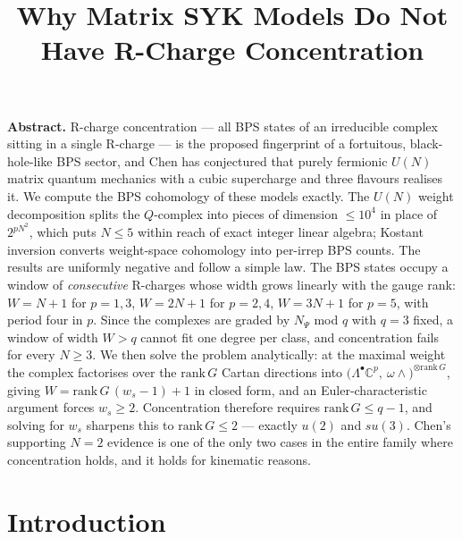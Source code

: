 \documentclass[10pt]{article}
\title{\vspace{-1.6cm}\Large\textbf{Why Matrix SYK Models Do Not Have R-Charge Concentration}\vspace{-4pt}}
\author{}
\date{}
\newcommand{\rank}{\mathrm{rank}\,}
\begin{document}
\maketitle
\vspace{-1.1cm}
\begin{center}\begin{minipage}{0.97\textwidth}\small
\textbf{Abstract.} R-charge concentration --- all BPS states of an irreducible complex sitting in a single R-charge --- is the proposed fingerprint of a fortuitous, black-hole-like BPS sector, and Chen has conjectured that purely fermionic $U(N)$ matrix quantum mechanics with a cubic supercharge and three flavours realises it. We compute the BPS cohomology of these models exactly. The $U(N)$ weight decomposition splits the $Q$-complex into pieces of dimension $\le 10^4$ in place of $2^{pN^2}$, which puts $N\le5$ within reach of exact integer linear algebra; Kostant inversion converts weight-space cohomology into per-irrep BPS counts. The results are uniformly negative and follow a simple law. The BPS states occupy a window of \emph{consecutive} R-charges whose width grows linearly with the gauge rank: $W=N+1$ for $p=1,3$, $W=2N+1$ for $p=2,4$, $W=3N+1$ for $p=5$, with period four in $p$. Since the complexes are graded by $N_\Psi$ mod $q$ with $q=3$ fixed, a window of width $W>q$ cannot fit one degree per class, and concentration fails for every $N\ge3$. We then solve the problem analytically: at the maximal weight the complex factorises over the $\rank G$ Cartan directions into $\big(\Lambda^\bullet\mathbb C^p,\ \omega\wedge\big)^{\otimes \rank G}$, giving $W=\rank G\,(w_s-1)+1$ in closed form, and an Euler-characteristic argument forces $w_s\ge2$. Concentration therefore requires $\rank G\le q-1$, and solving for $w_s$ sharpens this to $\rank G\le2$ --- exactly $u(2)$ and $su(3)$. Chen's supporting $N=2$ evidence is one of the only two cases in the entire family where concentration holds, and it holds for kinematic reasons.
\end{minipage}\end{center}
\vspace{10pt}

\section{Introduction}
\end{document}
